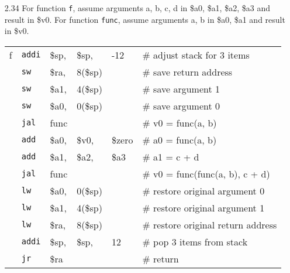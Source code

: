 \documentclass[12pt, a4paper]{article}
\begin{document}
\begin{itemize}[font=\bfseries]
\item[2.34]
For function \texttt{f}, assume arguments a, b, c, d in {\$}a0, {\$}a1, {\$}a2, {\$}a3 and result in {\$}v0. For function \texttt{func}, assume arguments a, b in {\$}a0, {\$}a1 and result in {\$}v0. \\   
\begin{tabular}[t]{|l l >{\raggedright}m{1.1cm} >{\raggedright}m{1.1cm} >{\raggedright}m{1.1cm} l|}
\hline
f & \texttt{addi} & {\$}sp, & {\$}sp, & -12 & \# adjust stack for 3 items \\
 & \texttt{sw} & {\$}ra, & 8({\$}sp) & & \# save return address \\
 & \texttt{sw} & {\$}a1, & 4({\$}sp) & & \# save argument 1 \\
 & \texttt{sw} & {\$}a0, & 0({\$}sp) & & \# save argument 0 \\
\hline
 & \texttt{jal} & func & & & \# v0 = func(a, b) \\
 & \texttt{add} & {\$}a0, & {\$}v0, & {\$}zero & \# a0 = func(a, b) \\
 & \texttt{add} & {\$}a1, & {\$}a2, & {\$}a3 & \# a1 = c + d \\
 & \texttt{jal} & func & & & \# v0 = func(func(a, b), c + d) \\
\hline
 & \texttt{lw} & {\$}a0, & 0({\$}sp) & & \# restore original argument 0 \\
 & \texttt{lw} & {\$}a1, & 4({\$}sp) & & \# restore original argument 1 \\
 & \texttt{lw} & {\$}ra, & 8({\$}sp) & & \# restore original return address \\
 & \texttt{addi} & {\$}sp, & {\$}sp, & 12 & \# pop 3 items from stack \\
 & \texttt{jr} & {\$}ra & & & \# return \\
\hline
\end{tabular}


\end{itemize}
\end{document}
